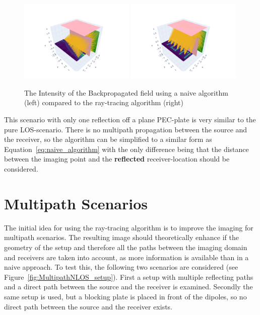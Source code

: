 \begin{figure}[ht]
    \centering
    \includegraphics[width=0.49\textwidth]{figures/nlos_naive_result.pdf}
    \includegraphics[width=0.49\textwidth]{figures/nlos_result.pdf}
    \caption{The Intensity of the Backpropagated field using a naive algorithm (left) compared to the ray-tracing algorithm (right)}\label{fig:nlos_results}
\end{figure}

This scenario with only one reflection off a plane PEC-plate is very similar to the pure LOS-scenario.
There is no multipath propagation between the source and the receiver, so the algorithm can be simplified to a similar form as Equation~\eqref{eq:naive_algorithm} with the only difference being that the distance between the imaging point and the \textbf{reflected} receiver-location should be considered.



\section{Multipath Scenarios}
The initial idea for using the ray-tracing algorithm is to improve the imaging for multipath scenarios.
The resulting image should theoretically enhance if the geometry of the setup and therefore all the paths between the imaging domain and receivers are taken into account, as more information is available than in a naive approach.
To test this, the following two scenarios are considered (see Figure~\ref{fig:MultipathNLOS_setup}).
First a setup with multiple reflecting paths and a direct path between the source and the receiver is examined.
Secondly the same setup is used, but a blocking plate is placed in front of the dipoles, so no direct path between the source and the receiver exists.


